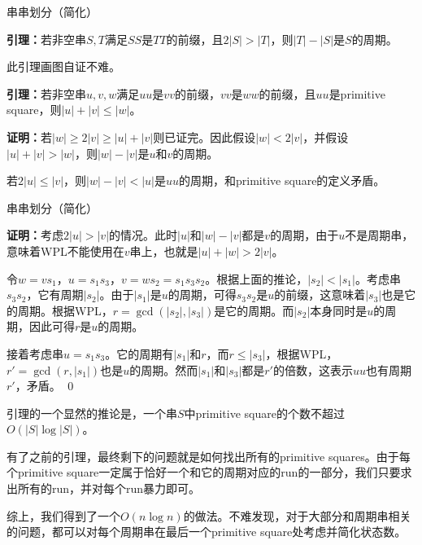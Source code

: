 \documentclass{beamer}
\begin{document}
\begin{frame}{串串划分（简化）}
	\par \textbf{引理：}若非空串$S,T$满足$SS$是$TT$的前缀，且$2|S|>|T|$，则$|T|-|S|$是$S$的周期。
	\par 此引理画图自证不难。
	\par \textbf{引理：}若非空串$u,v,w$满足$uu$是$vv$的前缀，$vv$是$ww$的前缀，且$uu$是primitive square，则$|u|+|v|\le|w|$。
	\pause
	\par \textbf{证明：}若$|w|\ge2|v|\ge|u|+|v|$则已证完。因此假设$|w|<2|v|$，并假设$|u|+|v|>|w|$，则$|w|-|v|$是$u$和$v$的周期。
	\pause
	\par 若$2|u|\le|v|$，则$|w|-|v|<|u|$是$uu$的周期，和primitive square的定义矛盾。
\end{frame}

\begin{frame}{串串划分（简化）}
	\par \textbf{证明：}考虑$2|u|>|v|$的情况。此时$|u|$和$|w|-|v|$都是$v$的周期，由于$u$不是周期串，意味着WPL不能使用在$v$串上，也就是$|u|+|w|>2|v|$。
	\pause
	\par 令$w=vs_1$，$u=s_1s_3$，$v=ws_2=s_1s_3s_2$。根据上面的推论，$|s_2|<|s_1|$。考虑串$s_3s_2$，它有周期$|s_2|$。由于$|s_1|$是$u$的周期，可得$s_3s_2$是$u$的前缀，这意味着$|s_3|$也是它的周期。根据WPL，$r=\gcd(|s_2|,|s_3|)$是它的周期。而$|s_2|$本身同时是$u$的周期，因此可得$r$是$u$的周期。
	\pause
	\par 接着考虑串$u=s_1s_3$。它的周期有$|s_1|$和$r$，而$r\le|s_3|$，根据WPL，$r'=\gcd(r,|s_1|)$也是$u$的周期。然而$|s_1|$和$|s_3|$都是$r'$的倍数，这表示$uu$也有周期$r'$，矛盾。
	\qed
	\pause
	\par 引理的一个显然的推论是，一个串$S$中primitive square的个数不超过$O(|S|\log|S|)$。
\end{frame}

\begin{frame}
	\par 有了之前的引理，最终剩下的问题就是如何找出所有的primitive squares。由于每个primitive square一定属于恰好一个和它的周期对应的run的一部分，我们只要求出所有的run，并对每个run暴力即可。
	\pause
	\par 综上，我们得到了一个$O(n\log n)$的做法。不难发现，对于大部分和周期串相关的问题，都可以对每个周期串在最后一个primitive square处考虑并简化状态数。
	\pause
\end{frame}
\end{document}
